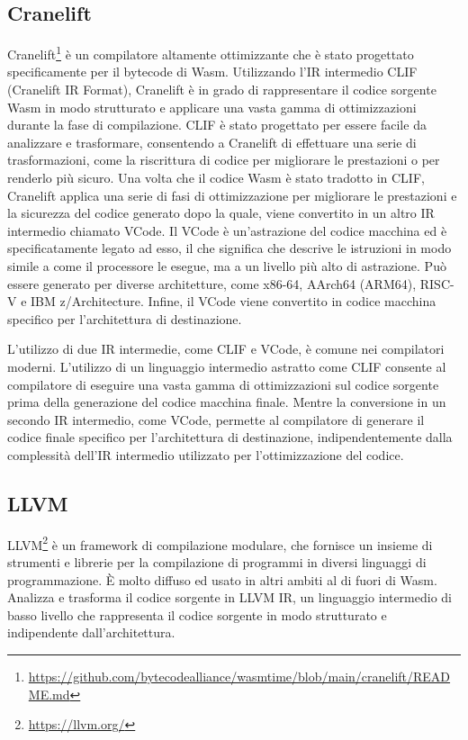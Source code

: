 \subsection{Cranelift}
Cranelift\footnote{\url{https://github.com/bytecodealliance/wasmtime/blob/main/cranelift/README.md}} è un compilatore
altamente ottimizzante che è stato progettato specificamente per il bytecode di Wasm. Utilizzando l'IR intermedio CLIF
(Cranelift IR Format), Cranelift è in grado di rappresentare il codice sorgente Wasm in modo strutturato e applicare una
vasta gamma di ottimizzazioni durante la fase di compilazione. CLIF è stato progettato per essere facile da analizzare e
trasformare, consentendo a Cranelift di effettuare una serie di trasformazioni, come la riscrittura di codice per
migliorare le prestazioni o per renderlo più sicuro. Una volta che il codice Wasm è stato tradotto in CLIF, Cranelift
applica una serie di fasi di ottimizzazione per migliorare le prestazioni e la sicurezza del codice generato dopo la
quale, viene convertito in un altro IR intermedio chiamato VCode. Il VCode è un'astrazione del codice macchina ed è
specificatamente legato ad esso, il che significa che descrive le istruzioni in modo simile a come il processore le
esegue, ma a un livello più alto di astrazione. Può essere generato per diverse architetture, come x86-64, AArch64
(ARM64), RISC-V e IBM z/Architecture. Infine, il VCode viene convertito in codice macchina specifico per l'architettura
di destinazione.

L'utilizzo di due IR intermedie, come CLIF e VCode, è comune nei compilatori moderni. L'utilizzo di un linguaggio
intermedio astratto come CLIF consente al compilatore di eseguire una vasta gamma di ottimizzazioni sul codice sorgente
prima della generazione del codice macchina finale. Mentre la conversione in un secondo IR intermedio, come VCode,
permette al compilatore di generare il codice finale specifico per l'architettura di destinazione, indipendentemente
dalla complessità dell'IR intermedio utilizzato per l'ottimizzazione del codice. 

\subsection{LLVM}
LLVM\footnote{\url{https://llvm.org/}} è un framework di compilazione modulare, che fornisce un insieme di strumenti e
librerie per la compilazione di programmi in diversi linguaggi di programmazione. È molto diffuso ed usato in altri
ambiti al di fuori di Wasm. Analizza e trasforma il codice sorgente in LLVM IR, un linguaggio intermedio di basso
livello che rappresenta il codice sorgente in modo strutturato e indipendente dall'architettura.

